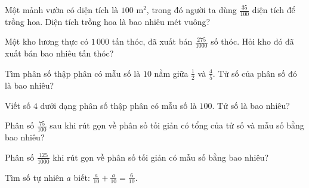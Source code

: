\begin{ex}
  Một mảnh vườn có diện tích là $100\text{ m}^2$, trong đó người ta dùng $\frac{35}{100}$ diện tích để trồng hoa. Diện tích trồng hoa là bao nhiêu mét vuông?
\end{ex}

\begin{ex}
  Một kho lương thực có $1\,000$ tấn thóc, đã xuất bán $\frac{275}{1000}$ số thóc. Hỏi kho đó đã xuất bán bao nhiêu tấn thóc?
\end{ex}

\begin{ex}
  Tìm phân số thập phân có mẫu số là $10$ nằm giữa $\frac{1}{2}$ và $\frac{4}{5}$. Tử số của phân số đó là bao nhiêu?
\end{ex}

\begin{ex}
  Viết số $4$ dưới dạng phân số thập phân có mẫu số là $100$. Tử số là bao nhiêu?
\end{ex}

\begin{ex}
  Phân số $\frac{75}{100}$ sau khi rút gọn về phân số tối giản có tổng của tử số và mẫu số bằng bao nhiêu?
\end{ex}

\begin{ex}
  Phân số $\frac{125}{1000}$ khi rút gọn về phân số tối giản có mẫu số bằng bao nhiêu?
\end{ex}

\begin{ex}
  Tìm số tự nhiên $a$ biết: $\frac{a}{10} + \frac{a}{10} = \frac{6}{10}$.
\end{ex}

